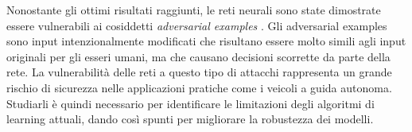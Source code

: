 Nonostante gli ottimi risultati raggiunti, le reti neurali sono state dimostrate essere vulnerabili ai cosiddetti \emph{adversarial examples} \cite{art2018}. Gli adversarial
examples sono input intenzionalmente modificati che risultano essere molto simili agli input originali per gli esseri umani, ma che causano decisioni scorrette
da parte della rete. La vulnerabilità delle reti a questo tipo di attacchi rappresenta un grande rischio di sicurezza nelle applicazioni pratiche come i veicoli a guida autonoma. Studiarli
è quindi necessario per identificare le limitazioni degli algoritmi di learning attuali, dando così spunti per migliorare la robustezza dei modelli.



    